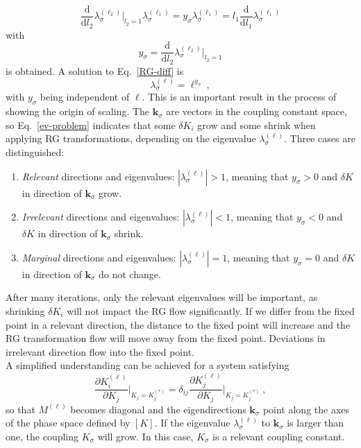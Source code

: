 	\begin{equation}\label{RG-diff}
		\frac{\text{d}}{\text{d}l_2} \lambda^{(\ell_2)}_{\sigma} \bigg |_{l_2 =	1} \lambda^{(\ell_1)}_{\sigma}  = y_\sigma \lambda^{(\ell_1)}_{\sigma} = l_1 \frac{\text{d}}{\text{d}l_1} \lambda^{(\ell_1)}_{\sigma}
	\end{equation}
	with
	\begin{equation}
		y_\sigma = \frac{\text{d}}{\text{d}l_2} \lambda^{(\ell_2)}_{\sigma} \bigg |_{l_2 =	1}
	\end{equation}
	is obtained.
	A solution to Eq.~{\eqref{RG-diff}} is
	\begin{equation} \label{ev-form}
		\lambda^{(\ell)}_{\sigma} = \ell^{y_\sigma}~,
	\end{equation}
	with $y_\sigma$ being independent of $\ell$. This is an important result in the process of showing the origin of scaling. The $\boldsymbol{k}_{\sigma}$ are vectors in the coupling constant space, so Eq.~\eqref{ev-problem} indicates that some $\delta K_i$ grow and some shrink when applying RG transformations, depending on the eigenvalue $\lambda^{(\ell)}_{\sigma}$. Three cases are distinguished:
	\begin{enumerate}
		\item \textit{Relevant} directions and eigenvalues:	$|\lambda^{(\ell)}_{\sigma}| > 1$, meaning that $y_\sigma > 0$ and $\delta K$ in direction of $\boldsymbol{k}_{\sigma}$ grow.
		\item \textit{Irrelevant} directions and eigenvalues:	$|\lambda^{(\ell)}_{\sigma}| < 1$, meaning that $y_\sigma < 0$ and $\delta K$ in direction of $\boldsymbol{k}_{\sigma}$ shrink.
		\item \textit{Marginal} directions and eigenvalues:	$|\lambda^{(\ell)}_{\sigma}| = 1$, meaning that $y_\sigma = 0$ and $\delta K$ in direction of $\boldsymbol{k}_{\sigma}$ do not change.
	\end{enumerate}
	After many iterations, only the relevant eigenvalues will be important, as shrinking $\delta K_i$ will not impact the RG flow significantly. If we differ from the fixed point in a relevant direction, the distance to the fixed point will increase and the RG transformation flow will move away from the fixed point. Deviations in irrelevant direction flow into the fixed point. \\
	
	A simplified understanding can be achieved for a system satisfying
	\begin{equation}
		\frac{\partial K_i^{(\ell)}}{\partial K_j} \bigg |_{K_j = K_j^{(*)}} = \delta_{ij} \frac{\partial K_j^{(\ell)}}{\partial K_j} \bigg |_{K_j = K_j^{(*)}}~,
	\end{equation}
	so that $M^{(\ell)}$ becomes diagonal and the eigendirections $\boldsymbol{k}_{\sigma}$ point along the axes of the phase space defined by $[K]$. If the eigenvalue $\lambda^{(\ell)}_{\sigma}$ to $\boldsymbol{k}_{\sigma}$ is larger than one, the coupling $K_\sigma$ will grow. In this case, $K_\sigma$ is a relevant coupling constant. \\
	
